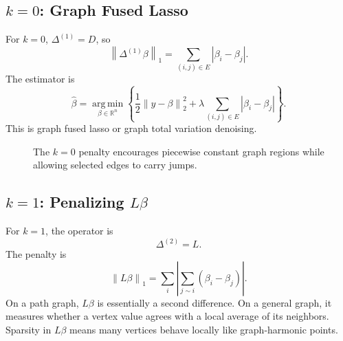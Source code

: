 \documentclass[11pt]{article}
\newcommand{\R}{\mathbb R}
\newcommand{\norm}[1]{\left\lVert #1 \right\rVert}
\newcommand{\argmin}{\operatorname*{arg\,min}}
\begin{document}
\subsection{\(k=0\): Graph Fused Lasso}

For \(k=0\), \(\Delta^{(1)}=D\), so
\[
  \norm{\Delta^{(1)}\beta}_1
  =
  \sum_{(i,j)\in E}|\beta_i-\beta_j|.
\]
The estimator is
\[
  \widehat\beta
  =
  \argmin_{\beta\in\R^n}
  \left\{
  \frac{1}{2}\norm{y-\beta}_2^2
  +
  \lambda\sum_{(i,j)\in E}|\beta_i-\beta_j|
  \right\}.
\]
This is graph fused lasso or graph total variation denoising.

\begin{figure}[ht]
\centering
{}
\caption{The \(k=0\) penalty encourages piecewise constant graph regions while
allowing selected edges to carry jumps.}
\end{figure}

\subsection{\(k=1\): Penalizing \(L\beta\)}

For \(k=1\), the operator is
\[
  \Delta^{(2)} = L.
\]
The penalty is
\[
  \norm{L\beta}_1
  =
  \sum_i \left|\sum_{j\sim i}(\beta_i-\beta_j)\right|.
\]
On a path graph, \(L\beta\) is essentially a second difference.  On a general
graph, it measures whether a vertex value agrees with a local average of its
neighbors.  Sparsity in \(L\beta\) means many vertices behave locally like
graph-harmonic points.
\end{document}

